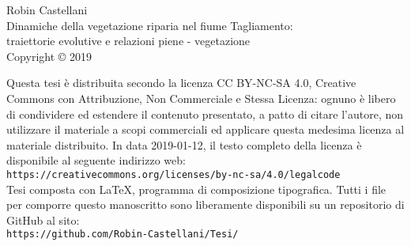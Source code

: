 \vspace*{0.35\textwidth}
%
\begin{center}
	Robin Castellani
	\\
	Dinamiche della vegetazione riparia nel fiume Tagliamento:
	\\
	traiettorie evolutive e relazioni piene - vegetazione
	\\
	Copyright \copyright{} 2019
\end{center}
%
\vfill
%
Questa tesi è distribuita secondo la licenza CC BY-NC-SA 4.0, Creative Commons con Attribuzione, Non Commerciale e Stessa Licenza: ognuno è libero di condividere ed estendere il contenuto presentato, a patto di citare l'autore, non utilizzare il materiale a scopi commerciali ed applicare questa medesima licenza al materiale distribuito.
In data 2019-01-12, il testo completo della licenza è disponibile al seguente indirizzo web:
\\
\texttt{https://creativecommons.org/licenses/by-nc-sa/4.0/legalcode}
\\
Tesi composta con \LaTeX{}, programma di composizione tipografica.
Tutti i file per comporre questo manoscritto sono liberamente disponibili su un repositorio di GitHub al sito:
\\
\texttt{https://github.com/Robin-Castellani/Tesi/}
